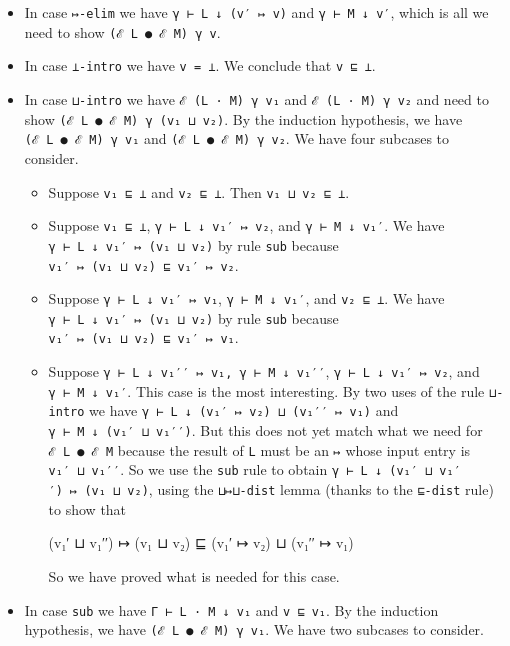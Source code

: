 \begin{itemize}
\item
  In case \texttt{↦-elim} we have \texttt{γ\ ⊢\ L\ ↓\ (v′\ ↦\ v)} and
  \texttt{γ\ ⊢\ M\ ↓\ v′}, which is all we need to show
  \texttt{(ℰ\ L\ ●\ ℰ\ M)\ γ\ v}.
\item
  In case \texttt{⊥-intro} we have \texttt{v\ =\ ⊥}. We conclude that
  \texttt{v\ ⊑\ ⊥}.
\item
  In case \texttt{⊔-intro} we have \texttt{ℰ\ (L\ ·\ M)\ γ\ v₁} and
  \texttt{ℰ\ (L\ ·\ M)\ γ\ v₂} and need to show
  \texttt{(ℰ\ L\ ●\ ℰ\ M)\ γ\ (v₁\ ⊔\ v₂)}. By the induction hypothesis,
  we have \texttt{(ℰ\ L\ ●\ ℰ\ M)\ γ\ v₁} and
  \texttt{(ℰ\ L\ ●\ ℰ\ M)\ γ\ v₂}. We have four subcases to consider.

  \begin{itemize}
  \item
    Suppose \texttt{v₁\ ⊑\ ⊥} and \texttt{v₂\ ⊑\ ⊥}. Then
    \texttt{v₁\ ⊔\ v₂\ ⊑\ ⊥}.
  \item
    Suppose \texttt{v₁\ ⊑\ ⊥}, \texttt{γ\ ⊢\ L\ ↓\ v₁′\ ↦\ v₂}, and
    \texttt{γ\ ⊢\ M\ ↓\ v₁′}. We have
    \texttt{γ\ ⊢\ L\ ↓\ v₁′\ ↦\ (v₁\ ⊔\ v₂)} by rule \texttt{sub}
    because \texttt{v₁′\ ↦\ (v₁\ ⊔\ v₂)\ ⊑\ v₁′\ ↦\ v₂}.
  \item
    Suppose \texttt{γ\ ⊢\ L\ ↓\ v₁′\ ↦\ v₁}, \texttt{γ\ ⊢\ M\ ↓\ v₁′},
    and \texttt{v₂\ ⊑\ ⊥}. We have
    \texttt{γ\ ⊢\ L\ ↓\ v₁′\ ↦\ (v₁\ ⊔\ v₂)} by rule \texttt{sub}
    because \texttt{v₁′\ ↦\ (v₁\ ⊔\ v₂)\ ⊑\ v₁′\ ↦\ v₁}.
  \item
    Suppose \texttt{γ\ ⊢\ L\ ↓\ v₁′′\ ↦\ v₁,\ γ\ ⊢\ M\ ↓\ v₁′′},
    \texttt{γ\ ⊢\ L\ ↓\ v₁′\ ↦\ v₂}, and \texttt{γ\ ⊢\ M\ ↓\ v₁′}. This
    case is the most interesting. By two uses of the rule
    \texttt{⊔-intro} we have
    \texttt{γ\ ⊢\ L\ ↓\ (v₁′\ ↦\ v₂)\ ⊔\ (v₁′′\ ↦\ v₁)} and
    \texttt{γ\ ⊢\ M\ ↓\ (v₁′\ ⊔\ v₁′′)}. But this does not yet match
    what we need for \texttt{ℰ\ L\ ●\ ℰ\ M} because the result of
    \texttt{L} must be an \texttt{↦} whose input entry is
    \texttt{v₁′\ ⊔\ v₁′′}. So we use the \texttt{sub} rule to obtain
    \texttt{γ\ ⊢\ L\ ↓\ (v₁′\ ⊔\ v₁′′)\ ↦\ (v₁\ ⊔\ v₂)}, using the
    \texttt{⊔↦⊔-dist} lemma (thanks to the \texttt{⊑-dist} rule) to show
    that

    \begin{myDisplay}
      (v₁′ ⊔ v₁′′) ↦ (v₁ ⊔ v₂) ⊑ (v₁′ ↦ v₂) ⊔ (v₁′′ ↦ v₁)
    \end{myDisplay}

    So we have proved what is needed for this case.
  \end{itemize}
\item
  In case \texttt{sub} we have \texttt{Γ\ ⊢\ L\ ·\ M\ ↓\ v₁} and
  \texttt{v\ ⊑\ v₁}. By the induction hypothesis, we have
  \texttt{(ℰ\ L\ ●\ ℰ\ M)\ γ\ v₁}. We have two subcases to consider.


\end{itemize}
